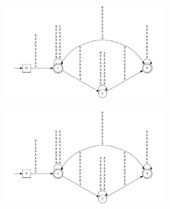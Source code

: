 \begin{figure}[h]
    \centering
    \begin{subfigure}{.99\textwidth}
        \centering 
        \begin{subfigure}{.49\textwidth}
            \centering
        \includegraphics[scale=0.29]{obrazky-figures/exp0_0_mona_aut.png}
            \caption{}
            \label{exp0_img0}
        \end{subfigure}
        \hfil
        \begin{subfigure}{.49\textwidth}
            \centering
            \includegraphics[scale=0.29]{obrazky-figures/exp0_1_mona_aut.png}
            \caption{}
            \label{exp0_img1}
        \end{subfigure}
    \end{subfigure} 
    \vfil
    \begin{subfigure}{.99\textwidth}
        \centering 
        \begin{subfigure}{.49\textwidth}
            \centering

\end{subfigure}
\end{subfigure}
\end{figure}
